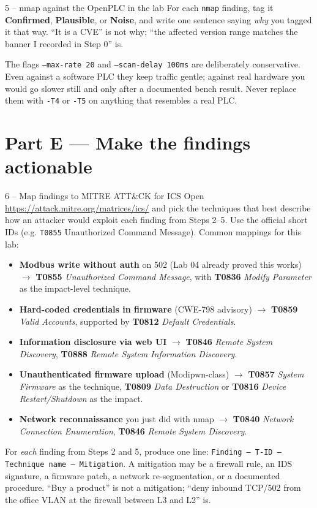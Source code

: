 \documentclass[11pt,a4paper]{article}
\begin{document}
\begin{stepbox}{5 -- nmap against the OpenPLC in the lab}
For each \texttt{nmap} finding, tag it \textbf{Confirmed}, \textbf{Plausible}, or \textbf{Noise}, and write one sentence saying \emph{why} you tagged it that way. ``It is a CVE'' is not why; ``the affected version range matches the banner I recorded in Step 0'' is.
\end{stepbox}

\begin{warnbox}
The flags \texttt{--max-rate 20} and \texttt{--scan-delay 100ms} are deliberately conservative. Even against a software PLC they keep traffic gentle; against real hardware you would go slower still and only after a documented bench result. Never replace them with \texttt{-T4} or \texttt{-T5} on anything that resembles a real PLC.
\end{warnbox}

\section*{Part E --- Make the findings actionable}

\begin{stepbox}{6 -- Map findings to MITRE ATT\&CK for ICS}
Open \url{https://attack.mitre.org/matrices/ics/} and pick the techniques that best describe how an attacker would exploit each finding from Steps 2--5. Use the official short IDs (e.g. \texttt{T0855} Unauthorized Command Message). Common mappings for this lab:

\begin{itemize}\setlength{\itemsep}{1pt}
  \item \textbf{Modbus write without auth} on 502 (Lab 04 already proved this works) $\rightarrow$ \textbf{T0855} \emph{Unauthorized Command Message}, with \textbf{T0836} \emph{Modify Parameter} as the impact-level technique.
  \item \textbf{Hard-coded credentials in firmware} (CWE-798 advisory) $\rightarrow$ \textbf{T0859} \emph{Valid Accounts}, supported by \textbf{T0812} \emph{Default Credentials}.
  \item \textbf{Information disclosure via web UI} $\rightarrow$ \textbf{T0846} \emph{Remote System Discovery}, \textbf{T0888} \emph{Remote System Information Discovery}.
  \item \textbf{Unauthenticated firmware upload} (Modipwn-class) $\rightarrow$ \textbf{T0857} \emph{System Firmware} as the technique, \textbf{T0809} \emph{Data Destruction} or \textbf{T0816} \emph{Device Restart/Shutdown} as the impact.
  \item \textbf{Network reconnaissance} you just did with nmap $\rightarrow$ \textbf{T0840} \emph{Network Connection Enumeration}, \textbf{T0846} \emph{Remote System Discovery}.
\end{itemize}

For \emph{each} finding from Steps 2 and 5, produce one line: \texttt{Finding -- T-ID -- Technique name -- Mitigation}. A mitigation may be a firewall rule, an IDS signature, a firmware patch, a network re-segmentation, or a documented procedure. ``Buy a product'' is not a mitigation; ``deny inbound TCP/502 from the office VLAN at the firewall between L3 and L2'' is.
\end{stepbox}
\end{document}
